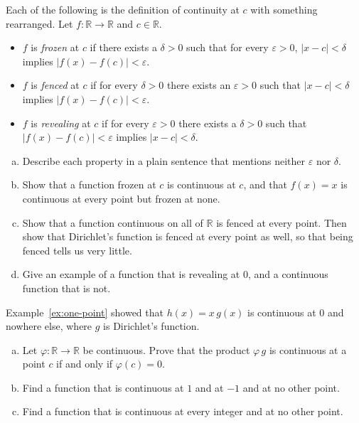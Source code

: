 \begin{problem}
Each of the following is the definition of continuity at $c$ with something rearranged.  Let $f : \mathbb{R} \to \mathbb{R}$ and $c \in \mathbb{R}$.
\begin{itemize}
	\item $f$ is \emph{frozen} at $c$ if there exists a $\delta > 0$ such that for every $\varepsilon > 0$, $|x - c| < \delta$ implies $|f(x) - f(c)| < \varepsilon$.
	\item $f$ is \emph{fenced} at $c$ if for every $\delta > 0$ there exists an $\varepsilon > 0$ such that $|x - c| < \delta$ implies $|f(x) - f(c)| < \varepsilon$.
	\item $f$ is \emph{revealing} at $c$ if for every $\varepsilon > 0$ there exists a $\delta > 0$ such that $|f(x) - f(c)| < \varepsilon$ implies $|x - c| < \delta$.
\end{itemize}
\begin{enumerate}[(a)]
	\item Describe each property in a plain sentence that mentions neither $\varepsilon$ nor $\delta$.
	\item Show that a function frozen at $c$ is continuous at $c$, and that $f(x) = x$ is continuous at every point but frozen at none.
	\item Show that a function continuous on all of $\mathbb{R}$ is fenced at every point.  Then show that Dirichlet's function is fenced at every point as well, so that being fenced tells us very little.
	\item Give an example of a function that is revealing at $0$, and a continuous function that is not.
\end{enumerate}
\end{problem}

\begin{problem}
Example~\ref{ex:one-point} showed that $h(x) = x\,g(x)$ is continuous at $0$ and nowhere else, where $g$ is Dirichlet's function.
\begin{enumerate}[(a)]
	\item Let $\varphi : \mathbb{R} \to \mathbb{R}$ be continuous.  Prove that the product $\varphi\,g$ is continuous at a point $c$ if and only if $\varphi(c) = 0$.
	\item Find a function that is continuous at $1$ and at $-1$ and at no other point.
	\item Find a function that is continuous at every integer and at no other point.
\end{enumerate}
\end{problem}

